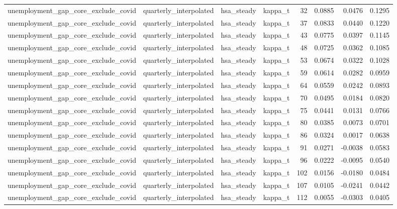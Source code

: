 \begin{tabular}{llllrrrr}
unemployment\_gap\_core\_exclude\_covid & quarterly\_interpolated & hsa\_steady & kappa\_t & 32 & 0.0885 & 0.0476 & 0.1295 \\
unemployment\_gap\_core\_exclude\_covid & quarterly\_interpolated & hsa\_steady & kappa\_t & 37 & 0.0833 & 0.0440 & 0.1220 \\
unemployment\_gap\_core\_exclude\_covid & quarterly\_interpolated & hsa\_steady & kappa\_t & 43 & 0.0775 & 0.0397 & 0.1145 \\
unemployment\_gap\_core\_exclude\_covid & quarterly\_interpolated & hsa\_steady & kappa\_t & 48 & 0.0725 & 0.0362 & 0.1085 \\
unemployment\_gap\_core\_exclude\_covid & quarterly\_interpolated & hsa\_steady & kappa\_t & 53 & 0.0674 & 0.0322 & 0.1028 \\
unemployment\_gap\_core\_exclude\_covid & quarterly\_interpolated & hsa\_steady & kappa\_t & 59 & 0.0614 & 0.0282 & 0.0959 \\
unemployment\_gap\_core\_exclude\_covid & quarterly\_interpolated & hsa\_steady & kappa\_t & 64 & 0.0559 & 0.0242 & 0.0893 \\
unemployment\_gap\_core\_exclude\_covid & quarterly\_interpolated & hsa\_steady & kappa\_t & 70 & 0.0495 & 0.0184 & 0.0820 \\
unemployment\_gap\_core\_exclude\_covid & quarterly\_interpolated & hsa\_steady & kappa\_t & 75 & 0.0441 & 0.0131 & 0.0766 \\
unemployment\_gap\_core\_exclude\_covid & quarterly\_interpolated & hsa\_steady & kappa\_t & 80 & 0.0385 & 0.0073 & 0.0701 \\
unemployment\_gap\_core\_exclude\_covid & quarterly\_interpolated & hsa\_steady & kappa\_t & 86 & 0.0324 & 0.0017 & 0.0638 \\
unemployment\_gap\_core\_exclude\_covid & quarterly\_interpolated & hsa\_steady & kappa\_t & 91 & 0.0271 & -0.0038 & 0.0583 \\
unemployment\_gap\_core\_exclude\_covid & quarterly\_interpolated & hsa\_steady & kappa\_t & 96 & 0.0222 & -0.0095 & 0.0540 \\
unemployment\_gap\_core\_exclude\_covid & quarterly\_interpolated & hsa\_steady & kappa\_t & 102 & 0.0156 & -0.0180 & 0.0484 \\
unemployment\_gap\_core\_exclude\_covid & quarterly\_interpolated & hsa\_steady & kappa\_t & 107 & 0.0105 & -0.0241 & 0.0442 \\
unemployment\_gap\_core\_exclude\_covid & quarterly\_interpolated & hsa\_steady & kappa\_t & 112 & 0.0055 & -0.0303 & 0.0405 \\

\end{tabular}
